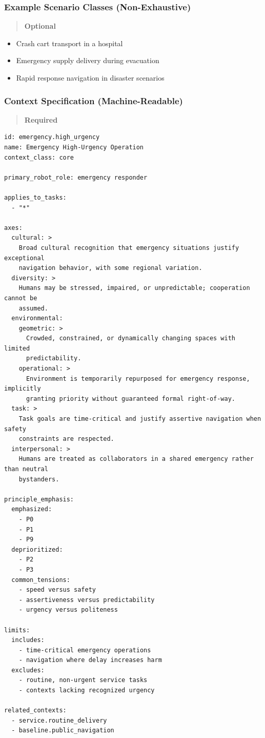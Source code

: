 \documentclass[utf8]{frontiers_suppmat} %
\providecommand{\tightlist}{%
  \setlength{\itemsep}{0pt}\setlength{\parskip}{0pt}}
\begin{document}
\subsubsection{Example Scenario Classes
(Non-Exhaustive)}\label{example-scenario-classes-non-exhaustive}

\begin{quote}
\textbf{Optional}
\end{quote}

\begin{itemize}
\tightlist
\item
  Crash cart transport in a hospital
\item
  Emergency supply delivery during evacuation
\item
  Rapid response navigation in disaster scenarios
\end{itemize}

\subsubsection{Context Specification
(Machine-Readable)}\label{context-specification-machine-readable}

\begin{quote}
\textbf{Required}
\end{quote}
\begin{lstlisting}[style=literatecard, label={context:urgent}]
id: emergency.high_urgency
name: Emergency High-Urgency Operation
context_class: core

primary_robot_role: emergency responder

applies_to_tasks:
  - "*"

axes:
  cultural: >
    Broad cultural recognition that emergency situations justify exceptional
    navigation behavior, with some regional variation.
  diversity: >
    Humans may be stressed, impaired, or unpredictable; cooperation cannot be
    assumed.
  environmental:
    geometric: >
      Crowded, constrained, or dynamically changing spaces with limited
      predictability.
    operational: >
      Environment is temporarily repurposed for emergency response, implicitly
      granting priority without guaranteed formal right-of-way.
  task: >
    Task goals are time-critical and justify assertive navigation when safety
    constraints are respected.
  interpersonal: >
    Humans are treated as collaborators in a shared emergency rather than neutral
    bystanders.

principle_emphasis:
  emphasized:
    - P0
    - P1
    - P9
  deprioritized:
    - P2
    - P3
  common_tensions:
    - speed versus safety
    - assertiveness versus predictability
    - urgency versus politeness

limits:
  includes:
    - time-critical emergency operations
    - navigation where delay increases harm
  excludes:
    - routine, non-urgent service tasks
    - contexts lacking recognized urgency

related_contexts:
  - service.routine_delivery
  - baseline.public_navigation
\end{lstlisting}
\end{document}
